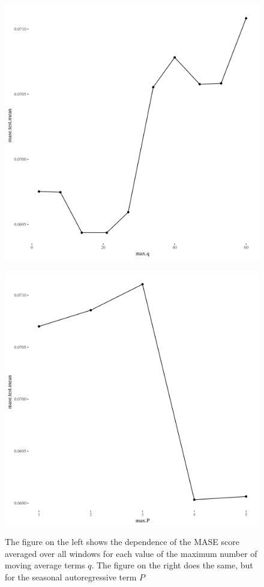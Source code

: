 \documentclass[12pt]{article}\usepackage[]{graphicx}\usepackage[]{color}
\theoremstyle{definition}
\begin{document}
\begin{figure}[h!]
\centering
\begin{minipage}{.5\textwidth}
  \centering
  \includegraphics[width=\linewidth]{tbats_dep_plot_max_q.png}
  \label{fig:tbatsDep1}
\end{minipage}%
\begin{minipage}{.5\textwidth}
  \centering
  \includegraphics[width=\linewidth]{tbats_dep_plot_max_p.png}
  \label{fig:tbatsDep2}
\end{minipage}
\caption{The figure on the left shows the dependence of the MASE score averaged over all windows for each value of the maximum number of moving average terms $q$. The figure on the right does the same, but for the seasonal autoregressive term $P$}
\end{figure}
\end{document}
